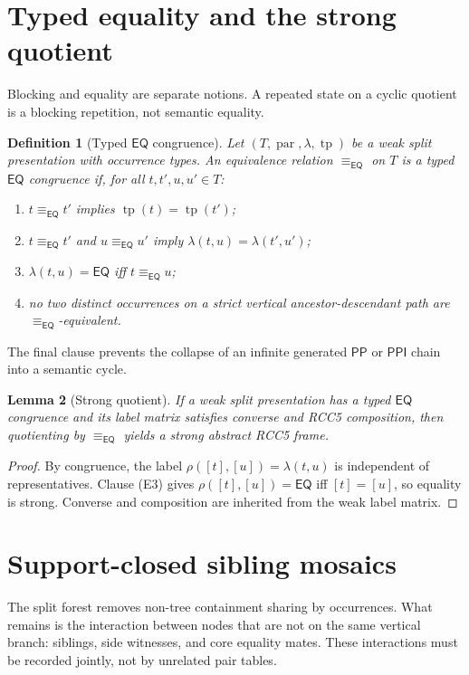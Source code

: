 \documentclass[11pt]{article}
\newtheorem{definition}{Definition}[section]
\newtheorem{lemma}[definition]{Lemma}
\theoremstyle{remark}
\newcommand{\PP}{\mathsf{PP}}
\newcommand{\PPI}{\mathsf{PPI}}
\newcommand{\EQ}{\mathsf{EQ}}
\newcommand{\tp}{\operatorname{tp}}
\newcommand{\parr}{\operatorname{par}}
\newcommand{\Eq}{\equiv_{\EQ}}
\begin{document}
\section{Typed equality and the strong quotient}
Blocking and equality are separate notions.  A repeated state on a cyclic quotient is a blocking repetition, not semantic equality.

\begin{definition}[Typed $\EQ$ congruence]
Let $(T,\parr,\lambda,\tp)$ be a weak split presentation with occurrence types.  An equivalence relation $\Eq$ on $T$ is a typed $\EQ$ congruence if, for all $t,t',u,u'\in T$:
\begin{enumerate}[label=(E\arabic*)]
\item $t\Eq t'$ implies $\tp(t)=\tp(t')$;
\item $t\Eq t'$ and $u\Eq u'$ imply $\lambda(t,u)=\lambda(t',u')$;
\item $\lambda(t,u)=\EQ$ iff $t\Eq u$;
\item no two distinct occurrences on a strict vertical ancestor-descendant path are $\Eq$-equivalent.
\end{enumerate}
\end{definition}

The final clause prevents the collapse of an infinite generated $\PP$ or $\PPI$ chain into a semantic cycle.

\begin{lemma}[Strong quotient]\label{lem:strong-quotient}
If a weak split presentation has a typed $\EQ$ congruence and its label matrix satisfies converse and RCC5 composition, then quotienting by $\Eq$ yields a strong abstract RCC5 frame.
\end{lemma}
\begin{proof}
By congruence, the label $\rho([t],[u])=\lambda(t,u)$ is independent of representatives.  Clause (E3) gives $\rho([t],[u])=\EQ$ iff $[t]=[u]$, so equality is strong.  Converse and composition are inherited from the weak label matrix.
\end{proof}

\section{Support-closed sibling mosaics}
The split forest removes non-tree containment sharing by occurrences.  What remains is the interaction between nodes that are not on the same vertical branch: siblings, side witnesses, and core equality mates.  These interactions must be recorded jointly, not by unrelated pair tables.
\end{document}
